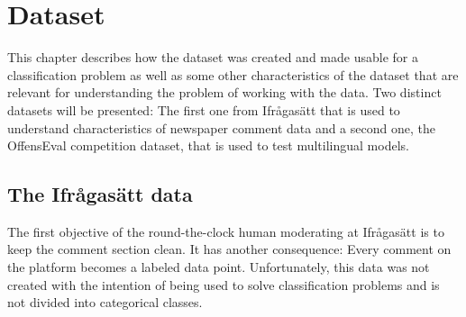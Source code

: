 \documentclass[nofilelist]{cslthse-msc}
\begin{document}

\chapter{Dataset}

This chapter describes how the dataset was created and made usable for a classification problem as well as some other characteristics of the dataset that are relevant for understanding the problem of working with the data. Two distinct datasets will be presented: The first one from Ifrågasätt that is used to understand characteristics of newspaper comment data and a second one, the OffensEval competition dataset, that is used to test multilingual models.

\section{The Ifrågasätt data}

The first objective of the round-the-clock human moderating at Ifrågasätt is to keep the comment section clean. It has another consequence: Every comment on the platform becomes a labeled data point. Unfortunately, this data was not created with the intention of being used to solve classification problems and is not divided into categorical classes.
\end{document}
